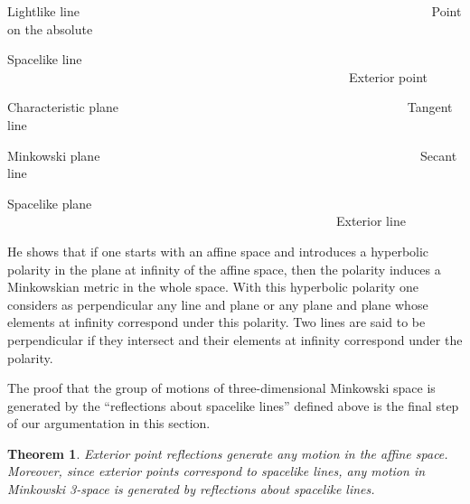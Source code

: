 \documentclass[a4paper,twoside,12pt]{article}
\newtheorem{theorem}{Theorem}[section]
\def\nind{\noindent}
\begin{document}
Lightlike line \ \ \ \ \ \ \ \ \ \ \ \ \ \ \ \ \ \ \ \ \ \ \ \ \ \ \ \ \ \ \
\ \ \ \ \ \ \ \ \ \ \ \ \ \ \ \ \ \ \ \ \ \ \ \ Point on the absolute

Spacelike line \ \ \ \ \ \ \ \ \ \ \ \ \ \ \ \ \ \ \ \ \ \ \ \ \ \ \ \ \ \ \
\ \ \ \ \ \ \ \ \ \ \ \ \ \ \ \ \ \ \ \ \ \ \ Exterior point

Characteristic plane \ \ \ \ \ \ \ \ \ \ \ \ \ \ \ \ \ \ \ \ \ \ \ \ \ \ \ \
\ \ \ \ \ \ \ \ \ \ \ \ \ \ \ \ \ Tangent line

Minkowski plane \ \ \ \ \ \ \ \ \ \ \ \ \ \ \ \ \ \ \ \ \ \ \ \ \ \ \ \ \ \
\ \ \ \ \ \ \ \ \ \ \ \ \ \ \ \ \ \ \ \ Secant line

Spacelike plane \ \ \ \ \ \ \ \ \ \ \ \ \ \ \ \ \ \ \ \ \ \ \ \ \ \ \ \ \ \
\ \ \ \ \ \ \ \ \ \ \ \ \ \ \ \ \ \ \ \ \ \ Exterior line

\medskip

\nind He shows that if one starts with an affine space and introduces a
hyperbolic polarity in the plane at infinity of the affine space, then the
polarity induces a Minkowskian metric in the whole space. With this
hyperbolic polarity one considers as perpendicular any line and plane or any
plane and plane whose elements at infinity correspond under this polarity.
Two lines are said to be perpendicular if they intersect and their elements
at infinity correspond under the polarity.

     The proof that the group of motions of three-dimensional Minkowski
space is generated by the ``reflections about spacelike lines'' defined
above is the final step of our argumentation in this section. 

\begin{theorem} \label{main}
Exterior point reflections generate any motion in the affine space. 
Moreover, since exterior points correspond to spacelike lines,
any motion in Minkowski 3-space is generated by reflections about
spacelike lines.
\end{theorem}
\end{document}
